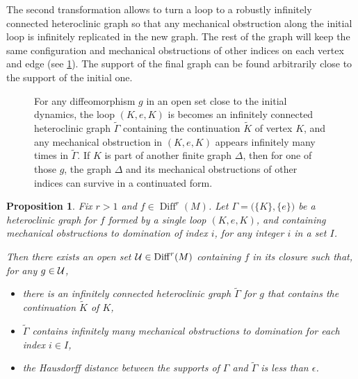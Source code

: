 \documentclass[11pt, a4paper]{amsart}
\theoremstyle{plain}
\newtheorem{proposition}{Proposition}[section]        %
\theoremstyle{definition}
\theoremstyle{remark}
\numberwithin{equation}{section}         %
\DeclareMathOperator{\Diff}{{Diff}}
\def\Diff{\operatorname{Diff}}
\begin{document}
The second transformation allows to turn a loop  to a robustly infinitely connected heteroclinic graph so that any mechanical obstruction along the initial loop is infinitely replicated in the new graph.  The rest of the graph will keep the same configuration and mechanical obstructions of other indices on each vertex and edge (see \cref{f.completiongraphe}). The support of the final graph can be found arbitrarily close to the support of the initial one.

 \begin{figure}%
\begin{center}
\def\svgwidth{250pt}           %

\end{center}
\caption{\small For any diffeomorphism $g$ in an open set close to the initial dynamics, the loop $(K,e,K)$ is becomes an infinitely connected heteroclinic graph $\tilde{\Gamma}$ containing the continuation $\tilde{K}$ of vertex $K$, and any mechanical obstruction in $(K,e,K)$ appears infinitely many times in $\tilde{\Gamma}$.
\vskip 1mm
If $K$ is part of another finite graph $\Delta$, then for one of those $g$, the graph $\Delta$ and its mechanical obstructions of other indices can survive in a continuated form.}
\label{f.completiongraphe}
\end{figure} 


\begin{proposition}\label{p.robustizing}
Fix $r>1$ and $f\in \Diff^r(M)$. Let $\Gamma=\bigl(\{K\},\{e\}\bigr)$ be a heteroclinic graph for $f$ formed by a single loop $(K,e,K)$, and containing mechanical obstructions to domination of index $i$, for any integer $i$ in a set $I$.

Then there exists an open set $\cU\in \Diff^r(M)$ containing $f$ in its closure such that, for any $g\in {\mathcal U}$,
\begin{itemize}
\item there is an infinitely connected heteroclinic graph $\tilde{\Gamma}$ for $g$ that contains the continuation $\tilde{K}$ of $K$,
\item  $\tilde{\Gamma}$ contains infinitely many mechanical obstructions to domination for each index $i\in I$,
\item the Hausdorff distance between the supports of $\Gamma$ and   $\tilde{\Gamma}$ is less than $\epsilon$.
\end{itemize} 
\end{proposition}
\end{document}
